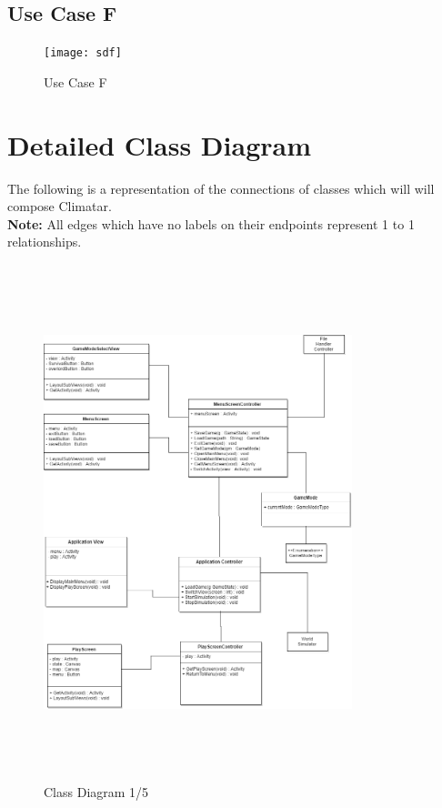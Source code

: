 \documentclass[]{article}
\begin{document}
\subsection{Use Case F}
\label{sub:overview}
\begin{figure}[H]
    \centering
    \texttt{[image: sdf]}
    \caption{Use Case F}
    \label{fig:sdf}
\end{figure}

\pagebreak
\section{Detailed Class Diagram}
\label{sec:detailed_class_diagram}
The following is a representation of the connections of classes which will will compose Climatar. \\
\textbf{Note:} All edges which have no labels on their endpoints represent 1 to 1 relationships.

\begin{figure}[h]
    \centering
    \includegraphics[width=0.8\textwidth , height=15cm, keepaspectratio]{dcdTL}
    \caption{Class Diagram 1/5}
    \label{fig:dcdTL}
\end{figure}
\end{document}
